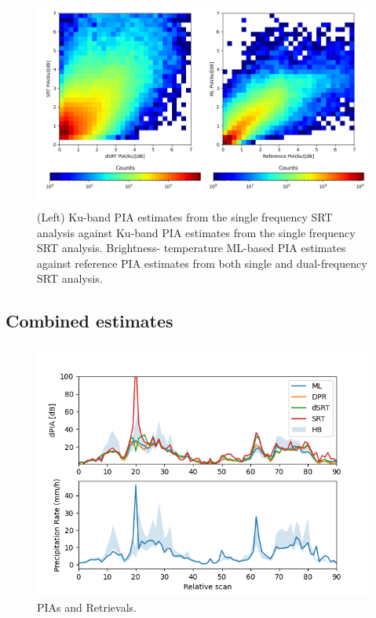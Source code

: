 \documentclass[10pt]{ietbook}
\begin{document}
\begin{figure} \label{fig:ML_PIA}
    \centerline{}
    \includegraphics[width=\textwidth]{ML_PIA.png}
    
    \caption{(Left) Ku-band PIA estimates from the single frequency SRT analysis against Ku-band PIA estimates from the single frequency SRT analysis. Brightness-
    temperature ML-based PIA estimates against reference PIA estimates from both single and dual-frequency SRT analysis.}
\end{figure}

\subsection{Combined estimates}

\begin{figure} \label{fig:retrievals}
    \centerline{}
    \includegraphics[width=\textwidth]{retPIA.png}
    
    \caption{PIAs and Retrievals.}
\end{figure}
\end{document}
